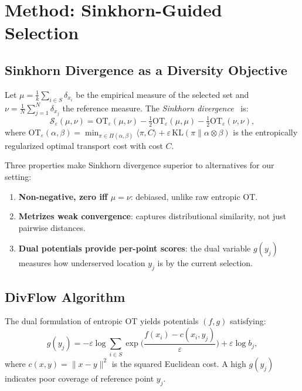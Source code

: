 \documentclass[10pt]{article}
\begin{document}
\section{Method: Sinkhorn-Guided Selection}
\label{sec:method}

\subsection{Sinkhorn Divergence as a Diversity Objective}

Let $\mu = \frac{1}{k}\sum_{i \in S} \delta_{x_i}$ be the empirical measure of the selected set and $\nu = \frac{1}{N}\sum_{j=1}^{N} \delta_{x_j}$ the reference measure.
The \emph{Sinkhorn divergence}~\citep{cuturi2013sinkhorn, feydy2019interpolating} is:
\begin{equation}
\mathcal{S}_\varepsilon(\mu, \nu) = \mathrm{OT}_\varepsilon(\mu, \nu) - \tfrac{1}{2}\mathrm{OT}_\varepsilon(\mu, \mu) - \tfrac{1}{2}\mathrm{OT}_\varepsilon(\nu, \nu),
\label{eq:sinkhorn}
\end{equation}
where $\mathrm{OT}_\varepsilon(\alpha, \beta) = \min_{\pi \in \Pi(\alpha,\beta)} \langle \pi, C \rangle + \varepsilon \,\mathrm{KL}(\pi \| \alpha \otimes \beta)$ is the entropically regularized optimal transport cost with cost $C$.

Three properties make Sinkhorn divergence superior to alternatives for our setting:
\begin{enumerate}[leftmargin=*,itemsep=1pt]
  \item \textbf{Non-negative, zero iff $\mu = \nu$}: debiased, unlike raw entropic OT.
  \item \textbf{Metrizes weak convergence}: captures distributional similarity, not just pairwise distances.
  \item \textbf{Dual potentials provide per-point scores}: the dual variable $g(y_j)$ measures how underserved location $y_j$ is by the current selection.
\end{enumerate}

\subsection{DivFlow Algorithm}

The dual formulation of entropic OT yields potentials $(f, g)$ satisfying:
\begin{equation}
g(y_j) = -\varepsilon \log \sum_{i \in S} \exp\!\Big(\frac{f(x_i) - c(x_i, y_j)}{\varepsilon}\Big) + \varepsilon \log b_j,
\label{eq:dual}
\end{equation}
where $c(x,y) = \|x-y\|^2$ is the squared Euclidean cost.
A high $g(y_j)$ indicates poor coverage of reference point $y_j$.
\end{document}
